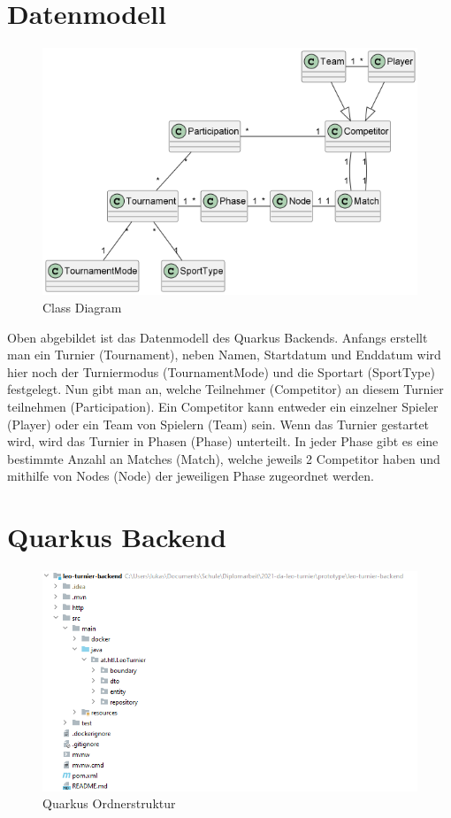\section{Datenmodell}

\begin{figure}[H]
    \includegraphics[scale=1]{pics/class_diagram.png}
    \caption{Class Diagram}
\end{figure}

Oben abgebildet ist das Datenmodell des Quarkus Backends. Anfangs erstellt man ein Turnier (Tournament), neben Namen, Startdatum und Enddatum 
wird hier noch der Turniermodus (TournamentMode) und die Sportart (SportType) festgelegt. Nun gibt man an, welche Teilnehmer (Competitor) an diesem Turnier teilnehmen (Participation). 
Ein Competitor kann entweder ein einzelner Spieler (Player) oder ein Team von Spielern (Team) sein.
Wenn das Turnier gestartet wird, wird das Turnier in Phasen (Phase) unterteilt. In jeder Phase gibt es eine bestimmte Anzahl an Matches (Match), welche jeweils 2 Competitor haben und mithilfe von Nodes (Node) 
der jeweiligen Phase zugeordnet werden.

\section{Quarkus Backend}

\begin{figure}[H]
    \includegraphics[scale=0.8]{pics/quarkus_file_structure.png}
    \caption{Quarkus Ordnerstruktur}
\end{figure}

